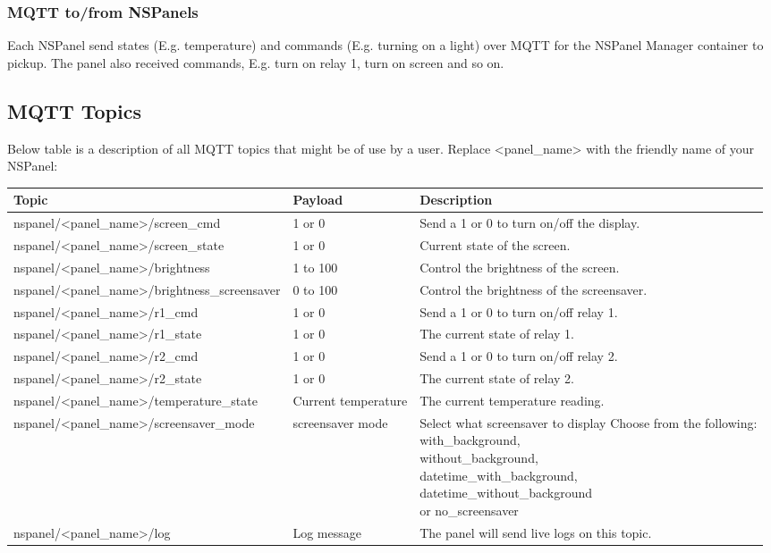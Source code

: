 \documentclass[10pt]{article}
\begin{document}
    \subsubsection{MQTT to/from NSPanels}
    Each NSPanel send states (E.g. temperature) and commands (E.g. turning on a light) over MQTT for the NSPanel Manager container to pickup. The panel also received commands, E.g. turn on relay 1, turn on screen and so on.

    \subsection{MQTT Topics}
    Below table is a description of all MQTT topics that might be of use by a user. Replace <panel\_name> with the friendly name of your NSPanel:
    \begin{table}[H]
    \begin{tabular}{|l|l|l|}
    \hline
    \textbf{Topic} & \textbf{Payload}  & \textbf{Description}  \\ \hline
    nspanel/<panel\_name>/screen\_cmd & 1 or 0 & Send a 1 or 0 to turn on/off the display. \\ \hline
    nspanel/<panel\_name>/screen\_state & 1 or 0 & Current state of the screen. \\ \hline
    nspanel/<panel\_name>/brightness & 1 to  100 & Control the brightness of the screen. \\ \hline
    nspanel/<panel\_name>/brightness\_screensaver & 0 to  100 & Control the brightness of the screensaver. \\ \hline
    nspanel/<panel\_name>/r1\_cmd & 1 or 0 & Send a 1 or 0 to turn on/off relay 1. \\ \hline
    nspanel/<panel\_name>/r1\_state & 1 or 0 & The current state of relay 1. \\ \hline
    nspanel/<panel\_name>/r2\_cmd & 1 or 0 & Send a 1 or 0 to turn on/off relay 2. \\ \hline
    nspanel/<panel\_name>/r2\_state & 1 or 0 & The current state of relay 2. \\ \hline
    nspanel/<panel\_name>/temperature\_state & Current temperature & The current temperature reading. \\ \hline
    nspanel/<panel\_name>/screensaver\_mode & screensaver mode & \parbox[t]{0.25\textwidth}{Select what screensaver to display Choose from the following:\\ with\_background,\\ without\_background,\\ datetime\_with\_background,\\ datetime\_without\_background\\ or no\_screensaver} \\ \hline
    nspanel/<panel\_name>/log & Log message & The panel will send live logs on this topic. \\ \hline
    \end{tabular}
    \end{table}
\end{document}

